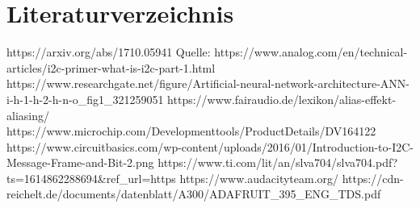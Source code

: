 \section{Literaturverzeichnis}

https://arxiv.org/abs/1710.05941
Quelle: https://www.analog.com/en/technical-articles/i2c-primer-what-is-i2c-part-1.html
 https://www.researchgate.net/figure/Artificial-neural-network-architecture-ANN-i-h-1-h-2-h-n-o_fig1_321259051
 https://www.fairaudio.de/lexikon/alias-effekt-aliasing/
 https://www.microchip.com/Developmenttools/ProductDetails/DV164122
 https://www.circuitbasics.com/wp-content/uploads/2016/01/Introduction-to-I2C-Message-Frame-and-Bit-2.png
 https://www.ti.com/lit/an/slva704/slva704.pdf?ts=1614862288694&ref_url=https%
 https://www.audacityteam.org/
 https://cdn-reichelt.de/documents/datenblatt/A300/ADAFRUIT_395_ENG_TDS.pdf